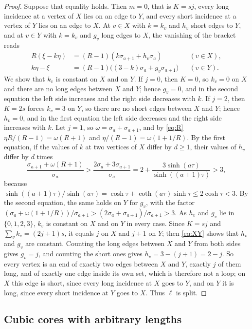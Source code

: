 \documentclass[11pt]{article}
\theoremstyle{definition}
\theoremstyle{remark}
\begin{document}
\begin{proof}
Suppose that equality holds. Then $m=0$, that is $K=sj$, every long incidence at a vertex of $X$ lies on an edge to $Y$,
and every short incidence at a vertex of $Y$ lies on an edge to $X$. At $v\in X$ with $k=k_v$ and $h_v$ short edges to
$Y$, and at $v\in Y$ with $k=k_v$ and $g_v$ long edges to $X$, the vanishing of the bracket reads
\begin{equation}\label{eq:XY}
\begin{aligned}
R(\xi-k\eta)&=(R-1)(k\sigma_{a+1}+h_v\sigma_a)&&(v\in X),\\
k\eta-\xi&=(R-1)\bigl((3-k)\sigma_a+g_v\sigma_{a+1}\bigr)&&(v\in Y).
\end{aligned}
\end{equation}
We show that $k_v$ is constant on $X$ and on $Y$. If $j=0$, then $K=0$, so $k_v=0$ on $X$ and there are no long edges
between $X$ and $Y$; hence $g_v=0$, and in the second equation the left side increases and the right side decreases
with $k$. If $j=2$, then $K=2s$ forces $k_v=3$ on $Y$, so there are no short edges between $X$ and $Y$; hence $h_v=0$,
and in the first equation the left side decreases and the right side increases with $k$. Let $j=1$, so
$\omega=\sigma_a+\sigma_{a+1}$, and by \eqref{eq:R} $\eta R/(R-1)=\omega(R+1)$ and $\eta/(R-1)=\omega(1+1/R)$. By the
first equation, if the values of $k$ at two vertices of $X$ differ by $d\ge1$, their values of $h_v$ differ by $d$ times
\[
\frac{\sigma_{a+1}+\omega(R+1)}{\sigma_a}>\frac{2\sigma_a+3\sigma_{a+1}}{\sigma_a}=2+\frac{3\sinh(a\tau)}{\sinh((a+1)\tau)}>3,
\]
because $\sinh((a+1)\tau)/\sinh(a\tau)=\cosh\tau+\coth(a\tau)\sinh\tau\le2\cosh\tau<3$. By the second equation, the
same holds on $Y$ for $g_v$, with the factor $(\sigma_a+\omega(1+1/R))/\sigma_{a+1}>(2\sigma_a+\sigma_{a+1})/\sigma_{a+1}>3$. As $h_v$ and $g_v$ lie in
$\{0,1,2,3\}$, $k_v$ is constant on $X$ and on $Y$ in every case. Since $K=sj$ and $\sum_vk_v=(2j+1)s$, it equals $j$ on
$X$ and $j+1$ on $Y$; then \eqref{eq:XY} shows that $h_v$ and $g_v$ are constant. Counting the long edges between $X$
and $Y$ from both sides gives $g_v=j$, and counting the short ones gives $h_v=3-(j+1)=2-j$. So every vertex is an end of
exactly two edges between $X$ and $Y$, exactly $j$ of them long, and of exactly one edge inside its own set, which is
therefore not a loop; on $X$ this edge is short, since every long incidence at $X$ goes to $Y$, and on $Y$ it is long,
since every short incidence at $Y$ goes to $X$. Thus $\ell$ is split.
\end{proof}

\subsection{Cubic cores with arbitrary lengths}
\end{document}
